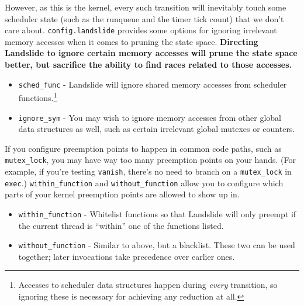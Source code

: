 \documentclass{article}
\begin{document}
However, as this is the kernel, every such transition will inevitably touch some scheduler state (such as the runqueue and the timer tick count) that we don't care about.
\texttt{config.landslide} provides some options for ignoring irrelevant memory accesses when it comes to pruning the state space. {\bf Directing Landslide to ignore certain memory accesses will prune the state space better, but sacrifice the ability to find races related to those accesses.}

\begin{itemize}
	\item \texttt{sched\_func} - Landslide will ignore shared memory accesses from scheduler functions.\footnote{Accesses to scheduler data structures happen during {\em every} transition, so ignoring these is necessary for achieving any reduction at all.}
	\item \texttt{ignore\_sym} - You may wish to ignore memory accesses from other global data structures as well, such as certain irrelevant global mutexes or counters.
\end{itemize}

If you configure preemption points to happen in common code paths, such as \texttt{mutex\_lock}, you may have way too many preemption points on your hands. (For example, if you're testing \texttt{vanish}, there's no need to branch on a \texttt{mutex\_lock} in \texttt{exec}.) \texttt{within\_function} and \texttt{without\_function} allow you to configure which parts of your kernel preemption points are allowed to show up in.

\begin{itemize}
	\item \texttt{within\_function} - Whitelist functions so that Landslide will only preempt if the current thread is ``within'' one of the functions listed.
	\item \texttt{without\_function} - Similar to above, but a blacklist. These two can be used together; later invocations take precedence over earlier ones.
\end{itemize}
\end{document}
